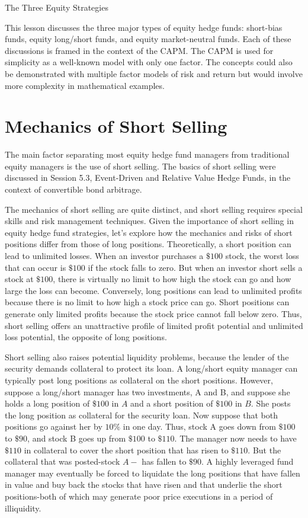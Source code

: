 \documentclass[11pt]{article}
\begin{document}
The Three Equity Strategies

This lesson discusses the three major types of equity hedge funds: short-bias funds, equity long/short funds, and equity market-neutral funds. Each of these discussions is framed in the context of the CAPM. The CAPM is used for simplicity as a well-known model with only one factor. The concepts could also be demonstrated with multiple factor models of risk and return but would involve more complexity in mathematical examples.

\section*{Mechanics of Short Selling}
The main factor separating most equity hedge fund managers from traditional equity managers is the use of short selling. The basics of short selling were discussed in Session 5.3, Event-Driven and Relative Value Hedge Funds, in the context of convertible bond arbitrage.

The mechanics of short selling are quite distinct, and short selling requires special skills and risk management techniques. Given the importance of short selling in equity hedge fund strategies, let's explore how the mechanics and risks of short positions differ from those of long positions. Theoretically, a short position can lead to unlimited losses. When an investor purchases a $\$ 100$ stock, the worst loss that can occur is $\$ 100$ if the stock falls to zero. But when an investor short sells a stock at $\$ 100$, there is virtually no limit to how high the stock can go and how large the loss can become. Conversely, long positions can lead to unlimited profits because there is no limit to how high a stock price can go. Short positions can generate only limited profits because the stock price cannot fall below zero. Thus, short selling offers an unattractive profile of limited profit potential and unlimited loss potential, the opposite of long positions.

Short selling also raises potential liquidity problems, because the lender of the security demands collateral to protect its loan. A long/short equity manager can typically post long positions as collateral on the short positions. However, suppose a long/short manager has two investments, A and B, and suppose she holds a long position of $\$ 100$ in $A$ and a short position of $\$ 100$ in $B$. She posts the long position as collateral for the security loan. Now suppose that both positions go against her by $10 \%$ in one day. Thus, stock A goes down from $\$ 100$ to $\$ 90$, and stock B goes up from $\$ 100$ to $\$ 110$. The manager now needs to have $\$ 110$ in collateral to cover the short position that has risen to $\$ 110$. But the collateral that was posted-stock $A-$ has fallen to $\$ 90$. A highly leveraged fund manager may eventually be forced to liquidate the long positions that have fallen in value and buy back the stocks that have risen and that underlie the short positions-both of which may generate poor price executions in a period of illiquidity.
\end{document}
